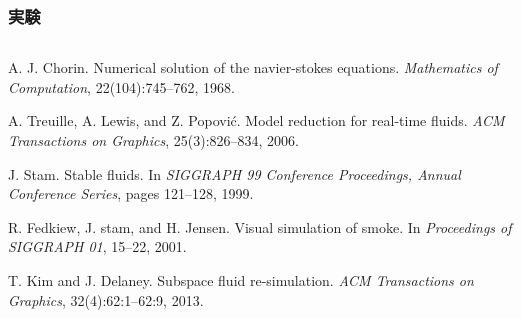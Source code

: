 \documentclass[aspectratio=169,dvipdfmx,hyperref={bookmarks=true}]{beamer}
\begin{document}
 \begin{frame}
 \frametitle{実験}

\begin{columns}
    \begin{column}{0.48\textwidth}
    \end{column}
    \begin{column}{0.48\textwidth}
    \end{column}
\end{columns}
\end{frame}
\begin{thebibliography}{99}
\beamertemplatetextbibitems

A. J. Chorin. Numerical solution of the navier-stokes equations. \textit{Mathematics of Computation}, 22(104):745--762, 1968.

A. Treuille, A. Lewis, and Z. Popovi\'{c}. Model reduction for real-time fluids. \textit{ACM Transactions on Graphics}, 25(3):826--834, 2006.

J. Stam. Stable fluids. In \textit{SIGGRAPH 99 Conference Proceedings, Annual Conference Series}, pages 121--128, 1999.

R. Fedkiew, J. stam, and H. Jensen. Visual simulation of smoke. In \textit{Proceedings of SIGGRAPH 01}, 15--22, 2001.

T. Kim and J. Delaney. Subspace fluid re-simulation. \textit{ACM Transactions on Graphics}, 32(4):62:1--62:9, 2013.


\end{thebibliography}
\end{document}
